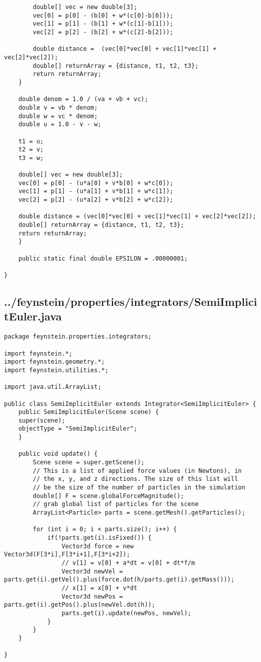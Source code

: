 \begin{lstlisting}
	    double[] vec = new double[3];
	    vec[0] = p[0] - (b[0] + w*(c[0]-b[0]));
	    vec[1] = p[1] - (b[1] + w*(c[1]-b[1]));
	    vec[2] = p[2] - (b[2] + w*(c[2]-b[2]));
	    
	    double distance =  (vec[0]*vec[0] + vec[1]*vec[1] + vec[2]*vec[2]);
	    double[] returnArray = {distance, t1, t2, t3};
	    return returnArray;
	}
	
	double denom = 1.0 / (va + vb + vc);
	double v = vb * denom;
	double w = vc * denom;
	double u = 1.0 - v - w;

	t1 = u;
	t2 = v;
	t3 = w;

	double[] vec = new double[3];
	vec[0] = p[0] - (u*a[0] + v*b[0] + w*c[0]);
	vec[1] = p[1] - (u*a[1] + v*b[1] + w*c[1]);
	vec[2] = p[2] - (u*a[2] + v*b[2] + w*c[2]);

	double distance = (vec[0]*vec[0] + vec[1]*vec[1] + vec[2]*vec[2]);
	double[] returnArray = {distance, t1, t2, t3};
	return returnArray;
    }
    
    public static final double EPSILON = .00000001;

}\end{lstlisting}

\subsection*{../feynstein/properties/integrators/SemiImplicitEuler.java}
\begin{lstlisting}
package feynstein.properties.integrators;

import feynstein.*;
import feynstein.geometry.*;
import feynstein.utilities.*;

import java.util.ArrayList;

public class SemiImplicitEuler extends Integrator<SemiImplicitEuler> {
    public SemiImplicitEuler(Scene scene) {
	super(scene);
	objectType = "SemiImplicitEuler";
    }
	
    public void update() {
		Scene scene = super.getScene();
		// This is a list of applied force values (in Newtons), in 
		// the x, y, and z directions. The size of this list will
		// be the size of the number of particles in the simulation
		double[] F = scene.globalForceMagnitude();
		// grab global list of particles for the scene
		ArrayList<Particle> parts = scene.getMesh().getParticles();
	
		for (int i = 0; i < parts.size(); i++) {
			if(!parts.get(i).isFixed()) {
				Vector3d force = new Vector3d(F[3*i],F[3*i+1],F[3*i+2]);
				// v[1] = v[0] + a*dt = v[0] + dt*f/m
				Vector3d newVel = parts.get(i).getVel().plus(force.dot(h/parts.get(i).getMass()));
				// x[1] = x[0] + v*dt
				Vector3d newPos = parts.get(i).getPos().plus(newVel.dot(h));
				parts.get(i).update(newPos, newVel);
			}
		}
    }

}\end{lstlisting}

